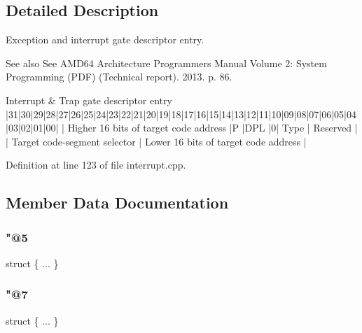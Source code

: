 \subsection{Detailed Description}
Exception and interrupt gate descriptor entry. 

\begin{DoxySeeAlso}{See also}
See A\+M\+D64 Architecture Programmer\textquotesingle{}s Manual Volume 2\+: System Programming (P\+DF) (Technical report). 2013. p. 86.
\end{DoxySeeAlso}
\begin{DoxyVerb}Interrupt & Trap gate descriptor entry
|31|30|29|28|27|26|25|24|23|22|21|20|19|18|17|16|15|14|13|12|11|10|09|08|07|06|05|04|03|02|01|00|
| Higher 16 bits of target code address         |P |DPL  |0|    Type    | Reserved              |
| Target code-segment selector                  | Lower 16 bits of target code address          |
\end{DoxyVerb}
 

Definition at line 123 of file interrupt.\+cpp.



\subsection{Member Data Documentation}
\mbox{\label{union_i_n_t_r_p_1_1_descriptor_entry_aa3e5f0c4f7186d01165a8a5c68c19cd7}} 
\subsubsection{\texorpdfstring{"@5}{@5}}
{\footnotesize\ttfamily struct \{ ... \} }

\mbox{\label{union_i_n_t_r_p_1_1_descriptor_entry_a2af38a2e445b1edbf0e8da359aca6f42}} 
\subsubsection{\texorpdfstring{"@7}{@7}}
{\footnotesize\ttfamily struct \{ ... \} }

\mbox{\label{union_i_n_t_r_p_1_1_descriptor_entry_a479e62ef6f3e27e03e121d965d6bab99}} 
